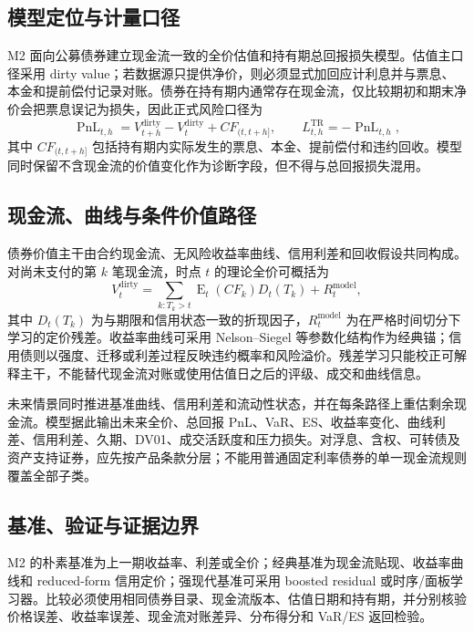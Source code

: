 \subsection{模型定位与计量口径}

M2 面向公募债券建立现金流一致的全价估值和持有期总回报损失模型。估值主口径采用 dirty value；若数据源只提供净价，则必须显式加回应计利息并与票息、本金和提前偿付记录对账。债券在持有期内通常存在现金流，仅比较期初和期末净价会把票息误记为损失，因此正式风险口径为
\begin{equation}
  \operatorname{PnL}_{t,h}=V_{t+h}^{\mathrm{dirty}}-V_t^{\mathrm{dirty}}+CF_{(t,t+h]},
  \qquad L_{t,h}^{\mathrm{TR}}=-\operatorname{PnL}_{t,h},
\end{equation}
其中 \(CF_{(t,t+h]}\) 包括持有期内实际发生的票息、本金、提前偿付和违约回收。模型同时保留不含现金流的价值变化作为诊断字段，但不得与总回报损失混用。

\subsection{现金流、曲线与条件价值路径}

债券价值主干由合约现金流、无风险收益率曲线、信用利差和回收假设共同构成。对尚未支付的第 \(k\) 笔现金流，时点 \(t\) 的理论全价可概括为
\begin{equation}
  V_t^{\mathrm{dirty}}
  =\sum_{k:T_k>t}\operatorname{E}_t(CF_k)D_t(T_k)
  +R_t^{\mathrm{model}},
\end{equation}
其中 \(D_t(T_k)\) 为与期限和信用状态一致的折现因子，\(R_t^{\mathrm{model}}\) 为在严格时间切分下学习的定价残差。收益率曲线可采用 Nelson--Siegel 等参数化结构作为经典锚\cite{nelson_siegel_1987}；信用债则以强度、迁移或利差过程反映违约概率和风险溢价\cite{duffie_singleton_1999}。残差学习只能校正可解释主干，不能替代现金流对账或使用估值日之后的评级、成交和曲线信息。

未来情景同时推进基准曲线、信用利差和流动性状态，并在每条路径上重估剩余现金流。模型据此输出未来全价、总回报 PnL、VaR、ES、收益率变化、曲线利差、信用利差、久期、DV01、成交活跃度和压力损失。对浮息、含权、可转债及资产支持证券，应先按产品条款分层；不能用普通固定利率债券的单一现金流规则覆盖全部子类。

\subsection{基准、验证与证据边界}

M2 的朴素基准为上一期收益率、利差或全价；经典基准为现金流贴现、收益率曲线和 reduced-form 信用定价；强现代基准可采用 boosted residual 或时序/面板学习器。比较必须使用相同债券目录、现金流版本、估值日期和持有期，并分别核验价格误差、收益率误差、现金流对账差异、分布得分和 VaR/ES 返回检验。

